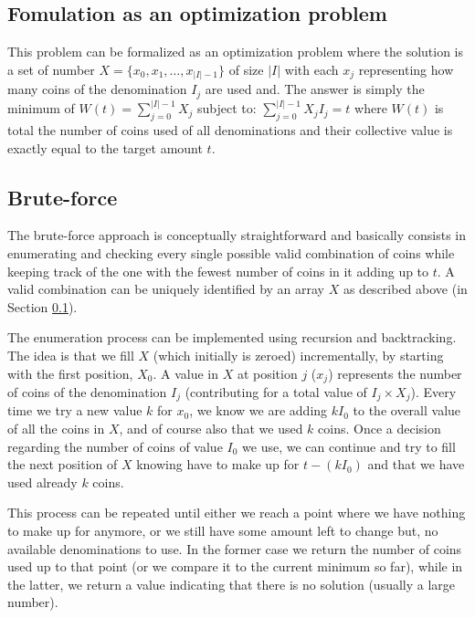 



\subsection{Fomulation as an optimization problem}
\label{coin_change:sec:mathdefinition}
This problem can be formalized as an optimization problem where the solution is a set of number $X=\{x_0,x_1,\ldots, x_{|I|-1}\}$ of size $|I|$ with each $x_j$ representing how many coins of the denomination $I_j$ are used and. The answer is simply the minimum of 
$
	W(t) = \sum_{j=0}^{|I|-1} X_j
$
subject to:
$
	\sum_{j=0}^{|I|-1} X_j I_j = t
$
where $W(t)$ is total the number of coins used of all denominations and their collective value is exactly equal to the target amount $t$.

\subsection{Brute-force}
\label{coin_change:sec:bruteforce}
The brute-force approach is conceptually straightforward and basically consists in enumerating and checking every single possible valid combination of coins
while keeping track of the one with the fewest number of coins in it adding up to $t$.
A valid combination can be uniquely identified by an array $X$ as described above (in Section \ref{coin_change:sec:mathdefinition}).

The enumeration process can be implemented using recursion and backtracking. 
The idea is that we fill $X$ (which initially is zeroed) incrementally, by starting with the first position, $X_0$.
A value in $X$ at position $j$ ($x_j$) represents the number of coins of the denomination $I_j$ (contributing for a total value of $I_j\times X_j$). 
Every time we try a new value $k$ for $x_0$, we know we are adding $kI_0$ to the overall value of all the coins in $X$, and of course also that we used $k$ coins.
Once a decision regarding the number of coins of value $I_0$ we use, we can continue and try to fill the next position of $X$ knowing have to make up for $t-(kI_0)$ and that we have used already $k$ coins. 

This process can be repeated until either we reach a point where we have nothing to make up for anymore, or we still have some amount left to change but, no available denominations to use.
In the former case we return the number of coins used up to that point (or we compare it to the current minimum so far), while in the latter, we return a value indicating that there is no solution (usually a large number).

